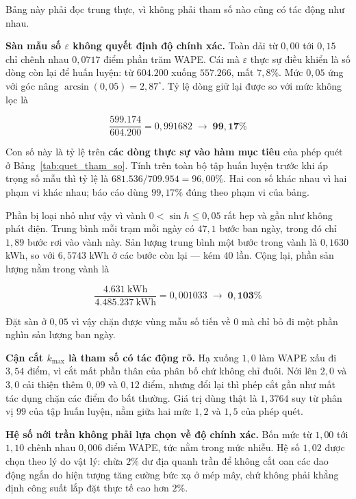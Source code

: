 \documentclass[12pt,a4paper]{article}
\begin{document}
Bảng này phải đọc trung thực, vì không phải tham số nào cũng có tác động như nhau.

\textbf{Sàn mẫu số $\varepsilon$ không quyết định độ chính xác.} Toàn dải từ $0{,}00$ tới
$0{,}15$ chỉ chênh nhau $0{,}0717$ điểm phần trăm WAPE. Cái mà $\varepsilon$ thực sự điều
khiển là số dòng còn lại để huấn luyện: từ $604.200$ xuống $557.266$, mất $7{,}8\%$. Mức
$0{,}05$ ứng với góc nâng $\arcsin(0{,}05) = 2{,}87^\circ$. Tỷ lệ dòng giữ lại được so với mức
không lọc là

\begin{equation}
\frac{599.174}{604.200} = 0{,}991682 \;\longrightarrow\; \mathbf{99{,}17\%}
\end{equation}

Con số này là tỷ lệ trên \textbf{các dòng thực sự vào hàm mục tiêu} của phép quét ở
Bảng~\ref{tab:quet_tham_so}. Tính trên toàn bộ tập huấn luyện trước khi áp trọng số mẫu thì
tỷ lệ là $681.536 / 709.954 = 96{,}00\%$. Hai con số khác nhau vì hai phạm vi khác nhau; báo
cáo dùng $99{,}17\%$ đúng theo phạm vi của bảng.

Phần bị loại nhỏ như vậy vì vành $0 < \sin h \le 0{,}05$ rất hẹp và gần như không phát điện.
Trung bình mỗi trạm mỗi ngày có $47{,}1$ bước ban ngày, trong đó chỉ $1{,}89$ bước rơi vào
vành này. Sản lượng trung bình một bước trong vành là $0{,}1630$ kWh, so với $6{,}5743$ kWh ở
các bước còn lại --- kém $40$ lần. Cộng lại, phần sản lượng nằm trong vành là

\begin{equation}
\frac{4.631\ \text{kWh}}{4.485.237\ \text{kWh}} = 0{,}001033 \;\longrightarrow\;
\mathbf{0{,}103\%}
\end{equation}

Đặt sàn ở $0{,}05$ vì vậy chặn được vùng mẫu số tiến về $0$ mà chỉ bỏ đi một phần nghìn sản
lượng ban ngày.

\textbf{Cận cắt $k_{\max}$ là tham số có tác động rõ.} Hạ xuống $1{,}0$ làm WAPE xấu đi
$3{,}54$ điểm, vì cắt mất phần thân của phân bố chứ không chỉ đuôi. Nới lên $2{,}0$ và $3{,}0$
cải thiện thêm $0{,}09$ và $0{,}12$ điểm, nhưng đổi lại thì phép cắt gần như mất tác dụng chặn
các điểm đo bất thường. Giá trị dùng thật là $1{,}3764$ suy từ phân vị $99$ của tập huấn
luyện, nằm giữa hai mức $1{,}2$ và $1{,}5$ của phép quét.

\textbf{Hệ số nới trần không phải lựa chọn về độ chính xác.} Bốn mức từ $1{,}00$ tới $1{,}10$
chênh nhau $0{,}006$ điểm WAPE, tức nằm trong mức nhiễu. Hệ số $1{,}02$ được chọn theo lý do
vật lý: chừa $2\%$ dư địa quanh trần để không cắt oan các dao động ngắn do hiện tượng tăng
cường bức xạ ở mép mây, chứ không phải khẳng định công suất lắp đặt thực tế cao hơn $2\%$.
\end{document}
